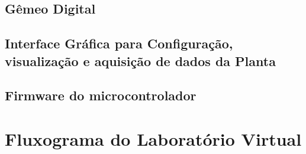 \subsection{ Gêmeo Digital}

%
\subsection{Interface Gráfica para Configuração, visualização e aquisição de dados da Planta}
\label{interface_graica}

%
\subsection{Firmware do microcontrolador}
\label{firmware}



\section{Fluxograma do Laboratório Virtual}
\label{flu_lab_virtual}



